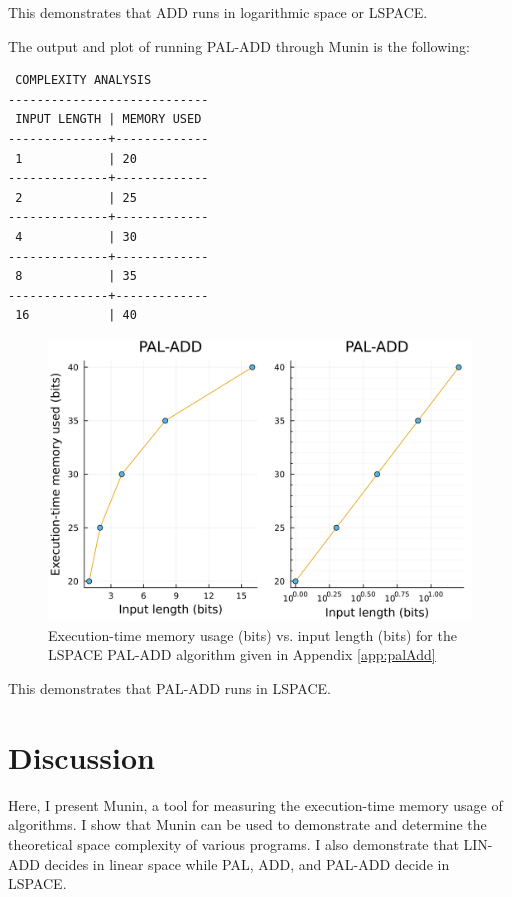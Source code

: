 \documentclass[11pt, a4paper]{article}
\begin{document}
This demonstrates that ADD runs in logarithmic space or LSPACE.

The output and plot of running PAL-ADD through Munin is the following:

\begin{lstlisting}
 COMPLEXITY ANALYSIS
----------------------------
 INPUT LENGTH | MEMORY USED 
--------------+-------------
 1            | 20      
--------------+-------------
 2            | 25      
--------------+-------------
 4            | 30      
--------------+-------------
 8            | 35      
--------------+-------------
 16           | 40      
\end{lstlisting}

\begin{figure}[H]
    \centering
    \includegraphics[width=\columnwidth]{PAL-ADD.png}
    \caption{Execution-time memory usage (bits) vs. input length (bits) for the LSPACE PAL-ADD algorithm given in Appendix \ref{app:palAdd}}
    \label{fig:palAdd}
\end{figure}

This demonstrates that PAL-ADD runs in LSPACE.

\section{Discussion}

Here, I present Munin, a tool for measuring the execution-time memory usage of algorithms.
I show that Munin can be used to demonstrate and determine the theoretical space complexity of various programs.
I also demonstrate that LIN-ADD decides in linear space while PAL, ADD, and PAL-ADD decide in LSPACE.
\end{document}
